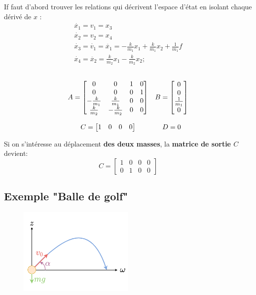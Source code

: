 \documentclass[document.tex]{subfiles}
\begin{document}
If faut d'abord trouver les relations qui décrivent l'espace d'état en isolant chaque dérivé de $x$ :
\begin{equation}
\begin{array}{c}
	\dot{x_1} = v_1 = x_3 \\[12pt]
	\dot{x_2} = v_2 = x_4 \\[12pt]
	\dot{x_3} = \dot{v_1} = \ddot{x_1} = -\frac{k}{m_1}x_1 + \frac{k}{m_1}x_2 + \frac{1}{m_1}f \\[12pt]
	\dot{x_4} = \ddot{x_2} =\frac{k}{m_2}x_1 - \frac{k}{m_2}x_2;
\end{array}
\end{equation}
\\[12pt]
\begin{equation}
\begin{array}{c c}
	A = \begin{bmatrix}
	0 & 0 & 1 & 0 \\ 0 & 0 & 0 & 1 \\ -\frac{k}{m_1} & \frac{k}{m_1} & 0 & 0  \\ \frac{k}{m_2} & -\frac{k}{m_2} & 0 & 0
	\end{bmatrix} & B = \begin{bmatrix}
	0 \\ 0 \\ \frac{1}{m_1} \\ 0
	\end{bmatrix} \\
	\; & \; \\
	C = \begin{bmatrix}
	1 & 0 & 0 & 0
	\end{bmatrix} & D = 0
\end{array}
\end{equation}

Si on s'intéresse au déplacement \textbf{des deux masses}, la \textbf{matrice de sortie $C$} devient:
\begin{equation}
	C = \begin{bmatrix}
		1 & 0 & 0 & 0 \\
		0 & 1 & 0 & 0
	\end{bmatrix}
\end{equation}

\subsection{Exemple "Balle de golf"}

\begin{figure}[H]
    \centering
    \includegraphics[width=0.5\textwidth]{Include/Figure/30.png}
\end{figure}
\end{document}
